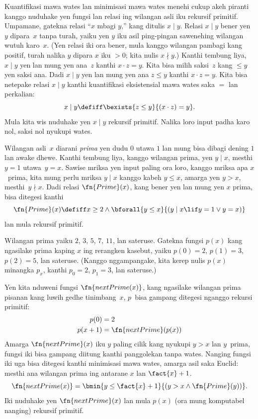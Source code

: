 \documentclass[../../../include/open-logic-section]{subfiles}
\begin{document}

Kuantifikasi mawa wates lan minimisasi mawa wates menehi
cukup akeh piranti kanggo nuduhake yen fungsi lan relasi
ing wilangan asli iku rekursif primitif. Umpamane, gatekna
relasi “$x$ mbagi $y$,” kang ditulis $x \mid y$. Relasi
$x \mid y$ bener yen $y$ dipara~$x$ tanpa
turah, yaiku yen $y$ iku asil ping-pingan
sawenehing wilangan wutuh karo~$x$. (Yen relasi
iki ora bener, mula kanggo wilangan pambagi kang positif,
turah nalika $y$ dipara $x$
iku $> 0$; kita nulis $x \nmid y$.)
%
%
Kanthi tembung liya, $x \mid y$ yen lan mung yen ana~$z$
kanthi $x \cdot z = y$. Kita bisa milih saksi~$z$
kang $\leq y$ yen saksi ana. Dadi $x \mid y$
yen lan mung yen ana $z \le y$ kanthi $x \cdot z = y$.
%
%
Kita bisa netepake relasi $x \mid y$ kanthi kuantifikasi
eksistensial mawa wates saka $=$ lan perkalian:
\[
x \mid y \defiff \bexists{z \leq y}{(x \cdot z) = y}.
\]
Mula kita wis nuduhake yen $x \mid y$ rekursif primitif. Nalika loro input padha karo nol, saksi nol nyukupi wates.

Wilangan asli~$x$ diarani \emph{prima} yen dudu $0$
utawa $1$ lan mung bisa dibagi dening $1$ lan
awake dhewe. Kanthi tembung liya, kanggo wilangan
prima, yen $y \mid x$, mesthi $y = 1$ utawa~$y=x$.
Sawise mriksa yen input paling ora loro, kanggo mriksa apa $x$~prima, kita mung perlu mriksa
$y \mid x$ kanggo kabeh $y \le x$, amarga yen
$y > x$, mesthi~$y \nmid x$. Dadi relasi
$\fn{Prime}(x)$, kang bener yen lan mung yen $x$
prima, bisa ditegesi kanthi
\[
\fn{Prime}(x) \defiff x \geq 2 \land \bforall{y \leq x}{(y \mid x \lif y
  = 1 \lor y = x)}
\]
lan mula rekursif primitif.

Wilangan prima yaiku $2$, $3$, $5$, $7$, $11$,
lan sateruse. Gatekna fungsi $p(x)$ kang ngasilake
prima kaping $x$ ing rerangken kasebut, yaiku
$p(0) = 2$, $p(1) = 3$, $p(2) = 5$, lan sateruse.
(Kanggo nggampangake, kita kerep nulis $p(x)$
minangka $p_x$, kanthi $p_0=2$, $p_1=3$, lan sateruse.)

Yen kita nduweni fungsi
$\fn{nextPrime(x)}$, kang ngasilake wilangan prima
pisanan kang luwih gedhe tinimbang~$x$, $p$~bisa
gampang ditegesi nganggo rekursi primitif:
\begin{align*}
  p(0) & = 2\\
  p(x+1) & = \fn{nextPrime}(p(x))
\end{align*}
Amarga $\fn{nextPrime}(x)$ iku $y$ paling cilik
kang nyukupi $y > x$ lan $y$~prima, fungsi iki
bisa gampang diitung kanthi panggolekan tanpa wates.
Nanging fungsi iki uga bisa ditegesi kanthi minimisasi
mawa wates, amarga asil saka Euclid: mesthi ana
wilangan prima ing antarane $x$ lan $\fact{x}+1$.
\[
  \fn{nextPrime(x)} =
  \bmin{y \leq \fact{x}+1}{(y > x \land \fn{Prime}(y))}.
\]
Iki nuduhake yen $\fn{nextPrime}(x)$ lan mula $p(x)$
(ora mung komputabel nanging) rekursif primitif.
\end{document}
